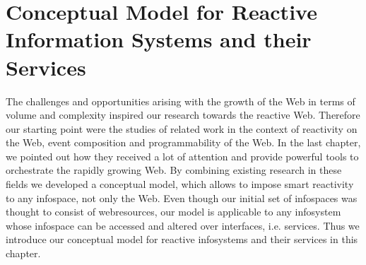 



\chapter{Conceptual Model for Reactive Information Systems and their Services}
The challenges and opportunities arising with the growth of the Web in terms of volume and complexity inspired our research towards the reactive Web.
Therefore our starting point were the studies of related work in the context of reactivity on the Web, event composition and programmability of the Web.
In the last chapter, we pointed out how they received a lot of attention and provide powerful tools to orchestrate the rapidly growing Web.
By combining existing research in these fields we developed a conceptual model, which allows to impose smart reactivity to any \textrm{\gls{infospace}}, not only the Web.
Even though our initial set of \textrm{\glspl{infospace}} was thought to consist of \textrm{\glspl{webresource}}, our model is applicable to any \textrm{\gls{infosystem}} whose \textrm{\gls{infospace}} can be accessed and altered over interfaces, i.e. services.
Thus we introduce our conceptual model for reactive \textrm{\glspl{infosystem}} and their services in this chapter.

